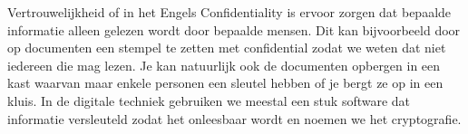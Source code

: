 Vertrouwelijkheid of in het Engels Confidentiality is ervoor zorgen dat bepaalde informatie alleen gelezen wordt door bepaalde mensen. Dit kan bijvoorbeeld door op documenten een stempel te zetten met confidential zodat we weten dat niet iedereen die mag lezen. Je kan natuurlijk ook de documenten opbergen in een kast waarvan maar enkele personen een sleutel hebben of je bergt ze op in een kluis. In de digitale techniek gebruiken we meestal een stuk software dat informatie versleuteld zodat het onleesbaar wordt en noemen we het cryptografie.

